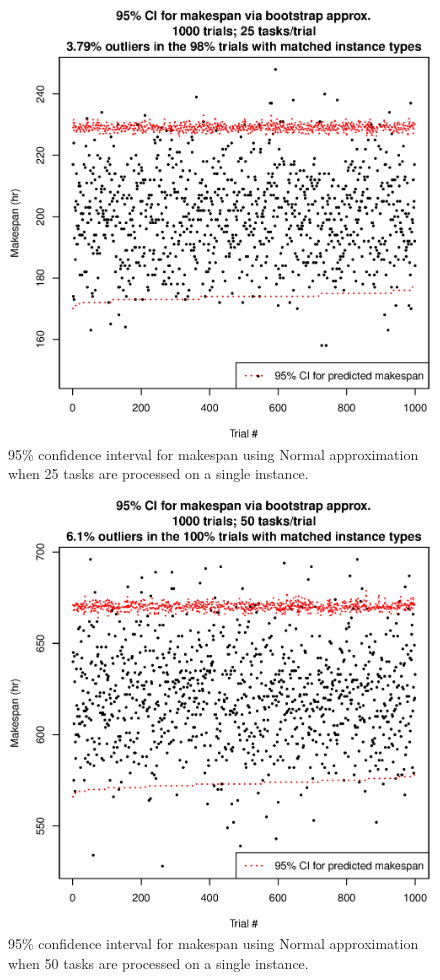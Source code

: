 \documentclass[12pt]{report}
\begin{document}
\begin{figure}
\includegraphics[width=1\textwidth]{validate-stochastic-runtimes-1000-trials-25-tasks.eps}
\caption{95\% confidence interval for makespan using Normal approximation when 25 tasks are processed on a single instance.}
\label{fig:validate-stochastic-runtimes-1000-trials-25-tasks}
\end{figure}

\begin{figure}
\includegraphics[width=1\textwidth]{validate-stochastic-runtimes-1000-trials-50-tasks.eps}
\caption{95\% confidence interval for makespan using Normal approximation when 50 tasks are processed on a single instance.}
\label{fig:validate-stochastic-runtimes-1000-trials-50-tasks}
\end{figure}
\end{document}
